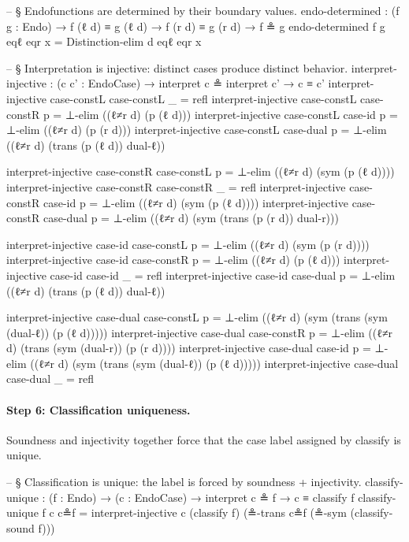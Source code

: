 \documentclass[11pt,a4paper]{book}
\def\texttt#1{#1}%
\begin{document}
\begin{code}
  -- § Endofunctions are determined by their boundary values.
  endo-determined :
    (f g : Endo) →
    f (ℓ d) ≡ g (ℓ d) →
    f (r d) ≡ g (r d) →
    f ≗ g
  endo-determined f g eqℓ eqr x = Distinction-elim d eqℓ eqr x

  -- § Interpretation is injective: distinct cases produce distinct behavior.
  interpret-injective :
    (c c' : EndoCase) →
    interpret c ≗ interpret c' →
    c ≡ c'
  interpret-injective case-constL case-constL _ = refl
  interpret-injective case-constL case-constR p = ⊥-elim ((ℓ≠r d) (p (ℓ d)))
  interpret-injective case-constL case-id     p = ⊥-elim ((ℓ≠r d) (p (r d)))
  interpret-injective case-constL case-dual   p =
    ⊥-elim ((ℓ≠r d) (trans (p (ℓ d)) dual-ℓ))

  interpret-injective case-constR case-constL p =
    ⊥-elim ((ℓ≠r d) (sym (p (ℓ d))))
  interpret-injective case-constR case-constR _ = refl
  interpret-injective case-constR case-id     p =
    ⊥-elim ((ℓ≠r d) (sym (p (ℓ d))))
  interpret-injective case-constR case-dual   p =
    ⊥-elim ((ℓ≠r d) (sym (trans (p (r d)) dual-r)))

  interpret-injective case-id     case-constL p =
    ⊥-elim ((ℓ≠r d) (sym (p (r d))))
  interpret-injective case-id     case-constR p = ⊥-elim ((ℓ≠r d) (p (ℓ d)))
  interpret-injective case-id     case-id     _ = refl
  interpret-injective case-id     case-dual   p =
    ⊥-elim ((ℓ≠r d) (trans (p (ℓ d)) dual-ℓ))

  interpret-injective case-dual   case-constL p =
    ⊥-elim ((ℓ≠r d) (sym (trans (sym (dual-ℓ)) (p (ℓ d)))))
  interpret-injective case-dual   case-constR p =
    ⊥-elim ((ℓ≠r d) (trans (sym (dual-r)) (p (r d))))
  interpret-injective case-dual   case-id     p =
    ⊥-elim ((ℓ≠r d) (sym (trans (sym (dual-ℓ)) (p (ℓ d)))))
  interpret-injective case-dual   case-dual   _ = refl
\end{code}

\paragraph{Step 6: Classification uniqueness.}
Soundness and injectivity together force that the case label assigned by \texttt{classify} is unique.

\begin{code}
  -- § Classification is unique: the label is forced by soundness + injectivity.
  classify-unique : (f : Endo) → (c : EndoCase) → interpret c ≗ f → c ≡ classify f
  classify-unique f c c≗f =
    interpret-injective c (classify f) (≗-trans c≗f (≗-sym (classify-sound f)))
\end{code}
\end{document}
